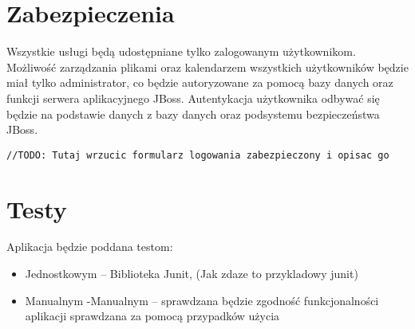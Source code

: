 \section{Zabezpieczenia}
Wszystkie usługi będą udostępniane tylko zalogowanym użytkownikom. Możliwość zarządzania plikami oraz kalendarzem wszystkich użytkowników będzie miał tylko administrator, co będzie autoryzowane za pomocą bazy danych oraz funkcji serwera aplikacyjnego JBoss. Autentykacja użytkownika odbywać się będzie na podstawie danych z bazy danych oraz podsystemu bezpieczeństwa JBoss.\\
\begin{lstlisting}
//TODO: Tutaj wrzucic formularz logowania zabezpieczony i opisac go
\end{lstlisting}
\section{Testy}
Aplikacja będzie poddana testom:
\begin{itemize}
	\item Jednostkowym – Biblioteka Junit, (Jak zdaze to przykladowy junit)
	\item Manualnym -Manualnym – sprawdzana będzie zgodność funkcjonalności aplikacji sprawdzana za pomocą przypadków użycia
\end{itemize}
